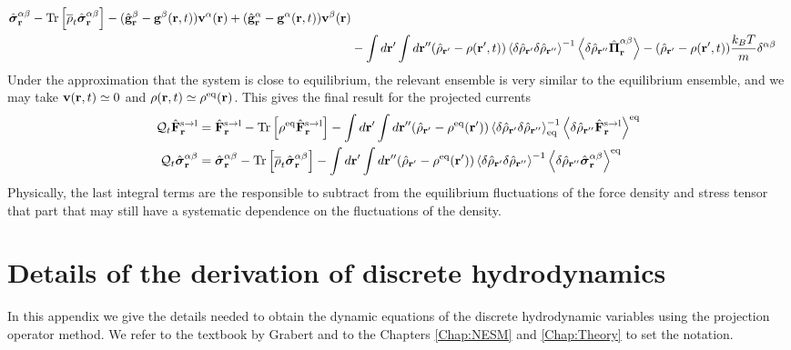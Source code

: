 \documentclass[b5paper,openright,10pt]{book}
\newcommand{\llangle}{\left\langle}
\newcommand{\rrangle}{\right\rangle}
\begin{document}
\begin{appendices}
\begin{align}
\hat{\boldsymbol{\sigma}}^{\alpha\beta}_{{\bf r}}-{\rm Tr}\left[\overline{\rho}_t\hat{\boldsymbol{\sigma}}^{\alpha\beta}_{{\bf r}}\right]
-(\hat{\bf g}^\beta_{{\bf r}}-{\bf g}^\beta({\bf r},t))
{\bf v}^\alpha({\bf r})+
(\hat{\bf g}^\alpha_{{\bf r}}-{\bf g}^\alpha({\bf r},t))
{\bf v}^\beta({\bf r})
\nonumber\\
&-\int d{\bf r}'\int d{\bf r}''(\hat{\rho}_{{\bf r}'}-{\rho}({\bf r}',t))
\llangle \delta\hat{\rho}_{{\bf r}'}\delta\hat{\rho}_{{\bf r}''}\rrangle^{-1}
\llangle \delta \hat{\rho}_{{\bf r}''}\hat{\boldsymbol{\Pi}}^{\alpha\beta}_{{\bf r}}\rrangle
-(\hat{\rho}_{{\bf r}'}-\rho({\bf r}',t))\frac{k_BT}{m}\delta^{\alpha\beta}
\label{QFS}
\end{align}
Under the approximation  that the system is close  to equilibrium, the
relevant ensemble is very similar  to the equilibrium ensemble, and we
may  take  ${\bf v}({\bf  r},t)\simeq  0$  and $\rho({\bf  r},t)\simeq
\rho^{\rm eq}({\bf r})$. This gives the final result for the projected
currents
\begin{align}
    {\cal Q}_t\hat{\bf F}^{\rm s\to l}_{{\bf r}}&=
\hat{\bf F}^{\rm s\to l}_{{\bf r}}- {\rm Tr}\left[\rho^{\rm eq}\hat{\bf F}^{\rm s\to l}_{{\bf r}}\right]
-\int d{\bf r}'\int d{\bf r}''(\hat{\rho}_{{\bf r}'}-{\rho}^{\rm eq}({\bf r}'))
\llangle \delta\hat{\rho}_{{\bf r}'}\delta\hat{\rho}_{{\bf r}''}\rrangle_{\rm eq}^{-1}
\llangle \delta \hat{\rho}_{{\bf r}''}\hat{\bf F}^{\rm s\to l}_{{\bf r}}\rrangle^{\rm eq}
\nonumber\\
  {\cal Q}_t\hat{\boldsymbol{\sigma}}^{\alpha\beta}_{{\bf r}}&=
\hat{\boldsymbol{\sigma}}^{\alpha\beta}_{{\bf r}}-{\rm Tr}\left[\overline{\rho}_t\hat{\boldsymbol{\sigma}}^{\alpha\beta}_{{\bf r}}\right]
-\int d{\bf r}'\int d{\bf r}''(\hat{\rho}_{{\bf r}'}-{\rho}^{\rm eq}({\bf r}'))
\llangle \delta\hat{\rho}_{{\bf r}'}\delta\hat{\rho}_{{\bf r}''}\rrangle^{-1}
\llangle \delta \hat{\rho}_{{\bf r}''}\hat{\boldsymbol{\sigma}}^{\alpha\beta}_{{\bf r}}\rrangle^{\rm eq}
\label{QFSeq}
\end{align}
Physically,  the  last integral terms    are  the  responsible  to
subtract from the  equilibrium fluctuations of the  force density and
stress tensor that part that may still have a systematic dependence on
the  fluctuations  of  the  density.  




\chapter{Details of the derivation of discrete hydrodynamics}
\label{Ap:KG}
In this  appendix we  give the  details needed  to obtain  the dynamic
equations of the discrete  hydrodynamic variables using the projection
operator   method.    We   refer   to   the    textbook   by   Grabert
\cite{Grabert1982}  and  to the Chapters \ref{Chap:NESM} and \ref{Chap:Theory} to set  the  notation.

\end{appendices}
\end{document}
